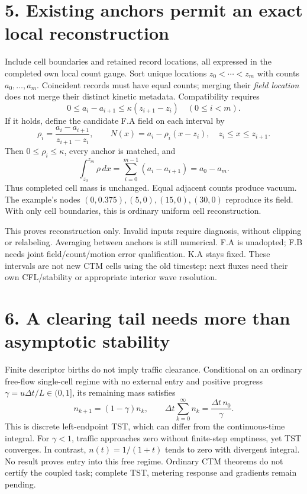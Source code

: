 \documentclass[11pt,a4paper]{article}
\begin{document}
\section*{5. Existing anchors permit an exact local reconstruction}
Include cell boundaries and retained record locations, all expressed in the
completed own local count gauge. Sort unique locations $z_0<\cdots<z_m$ with
counts $a_0,\ldots,a_m$. Coincident records must have equal counts; merging
their \emph{field location} does not merge their distinct kinetic metadata.
Compatibility requires
\begin{equation}
 0\le a_i-a_{i+1}\le\kappa(z_{i+1}-z_i)\quad(0\le i<m).
\end{equation}
If it holds, define the candidate F.A field on each interval by
\begin{equation}
 \rho_i=\frac{a_i-a_{i+1}}{z_{i+1}-z_i},\qquad
 N(x)=a_i-\rho_i(x-z_i),\quad z_i\le x\le z_{i+1}.
\end{equation}
Then $0\le\rho_i\le\kappa$, every anchor is matched, and
\begin{equation}
 \int_{z_0}^{z_m}\rho\,dx=\sum_{i=0}^{m-1}(a_i-a_{i+1})=a_0-a_m.
\end{equation}
Thus completed cell mass is unchanged. Equal adjacent counts produce vacuum.
The example's nodes $(0,0.375),(5,0),(15,0),(30,0)$ reproduce its field. With
only cell boundaries, this is ordinary uniform cell reconstruction.

This proves reconstruction only. Invalid inputs require diagnosis, without
clipping or relabeling. Averaging between anchors is still numerical. F.A is
unadopted; F.B needs joint field/count/motion error qualification. K.A stays
fixed. These intervals are not new CTM cells using the old timestep: next
fluxes need their own CFL/stability or appropriate interior wave resolution.

\section*{6. A clearing tail needs more than asymptotic stability}
Finite descriptor births do not imply traffic clearance. Conditional on an
ordinary free-flow single-cell regime with no external entry and positive
progress $\gamma=u\Delta t/L\in(0,1]$, its remaining mass satisfies
\begin{equation}
 n_{k+1}=(1-\gamma)n_k,\qquad
 \Delta t\sum_{k=0}^{\infty}n_k=\frac{\Delta t\,n_0}{\gamma}.
\end{equation}
This is discrete left-endpoint TST, which can differ from the continuous-time
integral. For $\gamma<1$, traffic approaches zero without finite-step emptiness,
yet TST converges. In contrast, $n(t)=1/(1+t)$ tends to zero with divergent
integral. No result proves entry into this free regime. Ordinary CTM theorems
do not certify the coupled task; complete TST, metering response and gradients
remain pending.
\end{document}
